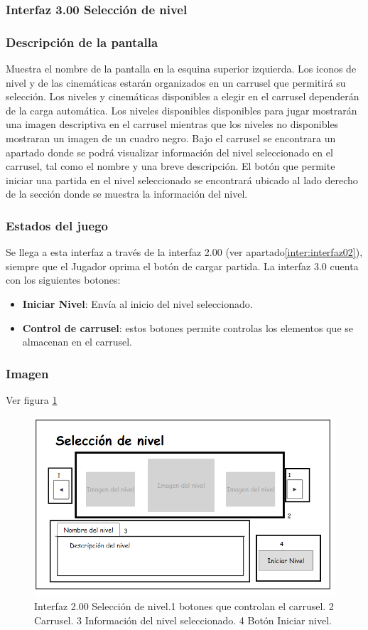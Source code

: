 \subsubsection{Interfaz 3.00 Selección de nivel}\label{inter:interfaz03}
	\subsubsection{Descripción de la pantalla}
Muestra el nombre de la pantalla en la esquina superior izquierda.
Los iconos de nivel y de las cinemáticas estarán organizados en un carrusel que permitirá su selección. Los niveles y cinemáticas disponibles a elegir en el carrusel dependerán de la carga automática. Los niveles disponibles disponibles para jugar mostrarán una imagen descriptiva en el carrusel mientras que los niveles no disponibles mostraran un imagen de un cuadro negro.   
Bajo el carrusel se encontrara un apartado donde se podrá visualizar información del nivel seleccionado en el carrusel, tal como el nombre y una breve descripción.
El botón que permite iniciar una partida en el nivel seleccionado se encontrará ubicado al lado derecho de la sección donde se muestra la información del nivel. 
	\subsubsection{Estados del juego}
Se llega a esta interfaz a través de la interfaz 2.00 (ver apartado\ref{inter:interfaz02}), siempre que el Jugador oprima el botón de cargar partida.
La interfaz 3.0 cuenta con los siguientes botones:
\begin{itemize}
	\item \textbf{Iniciar Nivel}: Envía al inicio del nivel seleccionado.
	\item \textbf{Control de carrusel}: estos botones permite controlas los elementos que se almacenan en el carrusel.
\end{itemize} 
	\subsubsection{Imagen}
	Ver figura \ref{fig:SelNivel}
\begin{figure}
  \centering
   \includegraphics[width=0.6 \textwidth]{05TrabajoRealizado/01DocDiseno/Interfaz/imagenes/interfaz02_01}
  \caption{Interfaz 2.00 Selección de nivel.1 botones que controlan el carrusel. 2 Carrusel. 3 Información del nivel seleccionado. 4 Botón Iniciar nivel.}
  \label{fig:SelNivel}
\end{figure} 